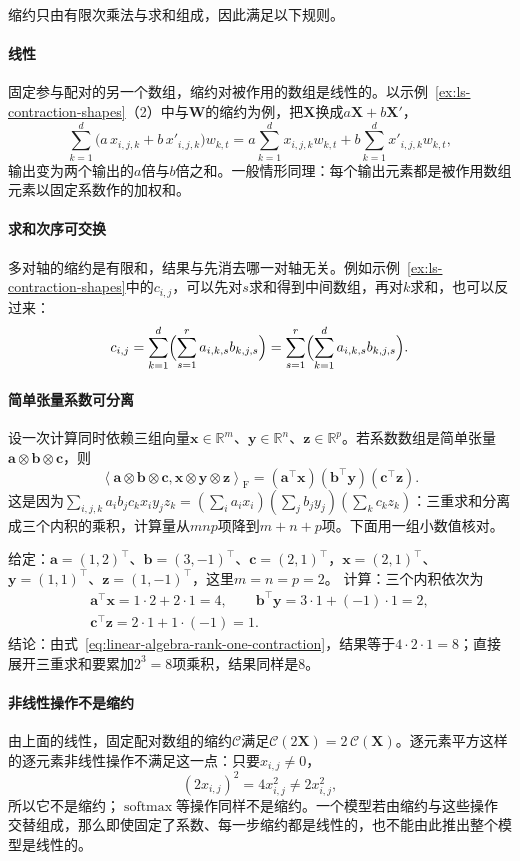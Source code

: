 缩约只由有限次乘法与求和组成，因此满足以下规则。

\paragraph{线性}
固定参与配对的另一个数组，缩约对被作用的数组是线性的。以示例~\ref{ex:ls-contraction-shapes}（2）中与$\bm W$的缩约为例，把$\bm X$换成$a\bm X+b\bm X'$，
\[
 \sum_{k=1}^d\bigl(a\,x_{i,j,k}+b\,x'_{i,j,k}\bigr)w_{k,t}
 =a\sum_{k=1}^d x_{i,j,k}w_{k,t}+b\sum_{k=1}^d x'_{i,j,k}w_{k,t},
\]
输出变为两个输出的$a$倍与$b$倍之和。一般情形同理：每个输出元素都是被作用数组元素以固定系数作的加权和。

\paragraph{求和次序可交换}
多对轴的缩约是有限和，结果与先消去哪一对轴无关。例如示例~\ref{ex:ls-contraction-shapes}中的$c_{i,j}$，可以先对$s$求和得到中间数组，再对$k$求和，也可以反过来：
\[
 c_{i,j}=\sum_{k=1}^d\Bigl(\sum_{s=1}^r a_{i,k,s}b_{k,j,s}\Bigr)
 =\sum_{s=1}^r\Bigl(\sum_{k=1}^d a_{i,k,s}b_{k,j,s}\Bigr).
\]

\paragraph{简单张量系数可分离}
设一次计算同时依赖三组向量$\bm x\in\mathbb R^m$、$\bm y\in\mathbb R^n$、$\bm z\in\mathbb R^p$。若系数数组是简单张量$\bm a\otimes\bm b\otimes\bm c$，则
\begin{equation}
 \left\langle\bm a\otimes\bm b\otimes\bm c,
 \bm x\otimes\bm y\otimes\bm z\right\rangle_{\mathrm F}
 =(\bm a^\top\bm x)(\bm b^\top\bm y)(\bm c^\top\bm z).
 \label{eq:linear-algebra-rank-one-contraction}
\end{equation}
这是因为$\sum_{i,j,k}a_ib_jc_kx_iy_jz_k=(\sum_ia_ix_i)(\sum_jb_jy_j)(\sum_kc_kz_k)$：三重求和分离成三个内积的乘积，计算量从$mnp$项降到$m+n+p$项。下面用一组小数值核对。
\begin{example}[简单张量系数的分离计算]
\label{ex:ls-rank-one-contraction-check}
给定：$\bm a=(1,2)^\top$、$\bm b=(3,-1)^\top$、$\bm c=(2,1)^\top$，$\bm x=(2,1)^\top$、$\bm y=(1,1)^\top$、$\bm z=(1,-1)^\top$，这里$m=n=p=2$。
计算：三个内积依次为
\[
 \begin{gathered}
 \bm a^\top\bm x=1\cdot2+2\cdot1=4,\qquad
 \bm b^\top\bm y=3\cdot1+(-1)\cdot1=2,\\
 \bm c^\top\bm z=2\cdot1+1\cdot(-1)=1.
 \end{gathered}
\]
结论：由式~\eqref{eq:linear-algebra-rank-one-contraction}，结果等于$4\cdot2\cdot1=8$；直接展开三重求和要累加$2^3=8$项乘积，结果同样是$8$。
\end{example}

\paragraph{非线性操作不是缩约}
由上面的线性，固定配对数组的缩约$\mathcal C$满足$\mathcal C(2\bm X)=2\,\mathcal C(\bm X)$。逐元素平方这样的逐元素非线性操作不满足这一点：只要$x_{i,j}\neq0$，
\[
 (2x_{i,j})^2=4x_{i,j}^2\neq2x_{i,j}^2,
\]
所以它不是缩约；$\operatorname{softmax}$等操作同样不是缩约。一个模型若由缩约与这些操作交替组成，那么即使固定了系数、每一步缩约都是线性的，也不能由此推出整个模型是线性的。
